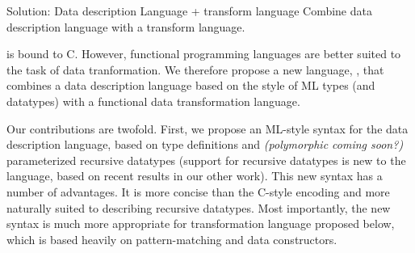 
Solution: Data description Language + transform language
Combine data description language with a transform language.

\pads{} is bound to C. However, functional programming languages are
better suited to the task of data tranformation. We therefore propose
a new language, \datatype{}, that combines a data description language
based on the style of ML types (and datatypes) with a functional data
transformation language. 

Our contributions are twofold. First, we propose an ML-style syntax
for the \pads{} data description language, based on type definitions
and {\em(polymorphic coming soon?)} parameterized recursive datatypes
(support for recursive datatypes is new to the \pads{} language, based
on recent results in our other work). This new syntax has a number of
advantages. It is more concise than the C-style encoding and more
naturally suited to describing recursive datatypes. Most importantly,
the new syntax is much more appropriate for transformation language
proposed below, which is based heavily on pattern-matching and data
constructors.


